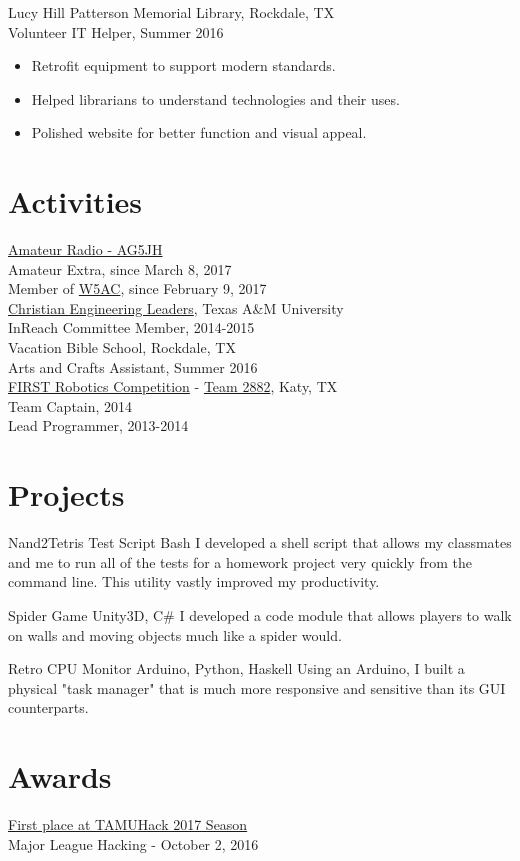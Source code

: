 \documentclass{article}
\begin{document}
\noindent
Lucy Hill Patterson Memorial Library, Rockdale, TX \\
Volunteer IT Helper, Summer 2016
\begin{itemize}
 \item Retrofit equipment to support modern standards.
 \item Helped librarians to understand technologies and their uses.
 \item Polished website for better function and visual appeal.
\end{itemize}


\section{Activities}

\noindent
\href{https://www.qrz.com/db/AG5JH}{Amateur Radio - AG5JH} \\
Amateur Extra, since March 8, 2017 \\
Member of \href{http://w5ac.tamu.edu}{W5AC}, since February 9, 2017 \\
\href{http://www.celtamu.com/}{Christian Engineering Leaders}, Texas A\&M University \\
InReach Committee Member, 2014-2015 \\
Vacation Bible School, Rockdale, TX \\
Arts and Crafts Assistant, Summer 2016 \\
\href{https://www.firstinspires.org/robotics/frc}{FIRST Robotics Competition} - \href{https://www.thebluealliance.com/team/2882}{Team 2882}, Katy, TX \\
Team Captain, 2014 \\
Lead Programmer, 2013-2014

\section{Projects}

Nand2Tetris Test Script Bash
I developed a shell script that allows my classmates and me to run all of the tests for a homework project very quickly from the command line. This utility vastly improved my productivity.

Spider Game Unity3D, C\#
I developed a code module that allows players to walk on walls and moving objects much like a spider would.

Retro CPU Monitor Arduino, Python, Haskell
Using an Arduino, I built a physical "task manager" that is much more responsive and sensitive than its GUI counterparts.

\section{Awards}

\noindent
\href{https://devpost.com/software/midas-evi574}{First place at TAMUHack 2017 Season} \\
Major League Hacking - October 2, 2016
\end{document}
